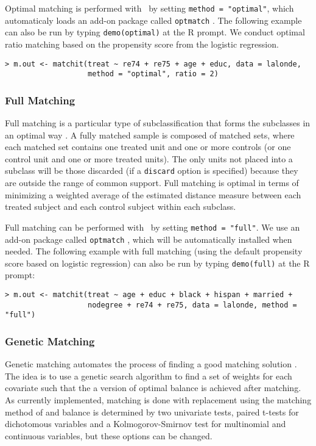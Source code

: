 Optimal matching is performed with \MatchIt\ by setting \texttt{method
  = "optimal"}, which automaticaly loads an add-on package called
\texttt{optmatch} \citep{Hansen04}.  The following example can also be
run by typing {\tt demo(optimal)} at the R prompt.  We conduct optimal
ratio matching based on the propensity score from the logistic
regression.
\begin{verbatim}
> m.out <- matchit(treat ~ re74 + re75 + age + educ, data = lalonde, 
                   method = "optimal", ratio = 2)
\end{verbatim}

\subsubsection{Full Matching}
\label{subsubsec:full}

Full matching is a particular type of subclassification that forms
the subclasses in an optimal way \citep{Rosenbaum02, Hansen04}.  A fully
matched sample is composed of matched sets, where each matched set
contains one treated unit and one or more controls (or one control
unit and one or more treated units).  The only units not placed into a
subclass will be those discarded (if a \texttt{discard} option is
specified) because they are outside the range of common support.  Full
matching is optimal in terms of minimizing a weighted average of the
estimated distance measure between each treated subject and each
control subject within each subclass.

Full matching can be performed with \MatchIt\ by setting
\texttt{method = "full"}.  We use an add-on package called
\texttt{optmatch} \citep{Hansen04}, which will be automatically
installed when needed.  The following example with full matching
(using the default propensity score based on logistic regression) can
also be run by typing {\tt demo(full)} at the R prompt:
\begin{verbatim}
> m.out <- matchit(treat ~ age + educ + black + hispan + married +
                   nodegree + re74 + re75, data = lalonde, method = "full")
\end{verbatim}

\subsubsection{Genetic Matching}
\label{subsub:genetic}

Genetic matching automates the process of finding a good matching
solution \citep{DiaSek05}.  The idea is to use a genetic search
algorithm to find a set of weights for each covariate such that the a
version of optimal balance is achieved after matching.  As currently
implemented, matching is done with replacement using the matching
method of \citet{AbaImb04} and balance is determined by two univariate
tests, paired t-tests for dichotomous variables and a
Kolmogorov-Smirnov test for multinomial and continuous variables, but
these options can be changed.

